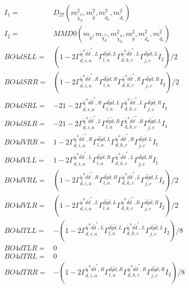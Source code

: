 \documentclass[A4,landscape]{article}
\begin{document}
\begin{align} 
I_1 = & D_{27}(m^2_{\tilde{\chi}^0_{{d}}}, m^2_{\tilde{g}}, m^2_{\tilde{d}_{{a}}}, m^2_{\tilde{d}_{{c}}}) \\ 
I_2 = & MMD0(m_{\tilde{g}}, m_{\tilde{\chi}^0_{{d}}}, m^2_{\tilde{\chi}^0_{{d}}}, m^2_{\tilde{g}}, m^2_{\tilde{d}_{{a}}}, m^2_{\tilde{d}_{{c}}}) \\ 
  BO4dSLL= & (1
-
2 \Gamma^{\tilde{\chi}^0 d \tilde{d}^*,L}_{d, i, a} \Gamma^{\bar{d}\tilde{g} \tilde{d} ,L}_{l, a} \Gamma^{\tilde{\chi}^0 d \tilde{d}^*,L}_{d, k, c} \Gamma^{\bar{d}\tilde{g} \tilde{d} ,L}_{j, c} I_2)/2 \\ 
  BO4dSRR= & (1
-
2 \Gamma^{\tilde{\chi}^0 d \tilde{d}^*,R}_{d, i, a} \Gamma^{\bar{d}\tilde{g} \tilde{d} ,R}_{l, a} \Gamma^{\tilde{\chi}^0 d \tilde{d}^*,R}_{d, k, c} \Gamma^{\bar{d}\tilde{g} \tilde{d} ,R}_{j, c} I_2)/2 \\ 
  BO4dSRL= & -2 1
-
2 \Gamma^{\tilde{\chi}^0 d \tilde{d}^*,R}_{d, i, a} \Gamma^{\bar{d}\tilde{g} \tilde{d} ,L}_{l, a} \Gamma^{\tilde{\chi}^0 d \tilde{d}^*,L}_{d, k, c} \Gamma^{\bar{d}\tilde{g} \tilde{d} ,R}_{j, c} I_1 \\ 
  BO4dSLR= & -2 1
-
2 \Gamma^{\tilde{\chi}^0 d \tilde{d}^*,L}_{d, i, a} \Gamma^{\bar{d}\tilde{g} \tilde{d} ,R}_{l, a} \Gamma^{\tilde{\chi}^0 d \tilde{d}^*,R}_{d, k, c} \Gamma^{\bar{d}\tilde{g} \tilde{d} ,L}_{j, c} I_1 \\ 
  BO4dVRR= & 1
-
2 \Gamma^{\tilde{\chi}^0 d \tilde{d}^*,R}_{d, i, a} \Gamma^{\bar{d}\tilde{g} \tilde{d} ,L}_{l, a} \Gamma^{\tilde{\chi}^0 d \tilde{d}^*,R}_{d, k, c} \Gamma^{\bar{d}\tilde{g} \tilde{d} ,L}_{j, c} I_1 \\ 
  BO4dVLL= & 1
-
2 \Gamma^{\tilde{\chi}^0 d \tilde{d}^*,L}_{d, i, a} \Gamma^{\bar{d}\tilde{g} \tilde{d} ,R}_{l, a} \Gamma^{\tilde{\chi}^0 d \tilde{d}^*,L}_{d, k, c} \Gamma^{\bar{d}\tilde{g} \tilde{d} ,R}_{j, c} I_1 \\ 
  BO4dVRL= & (1
-
2 \Gamma^{\tilde{\chi}^0 d \tilde{d}^*,R}_{d, i, a} \Gamma^{\bar{d}\tilde{g} \tilde{d} ,R}_{l, a} \Gamma^{\tilde{\chi}^0 d \tilde{d}^*,L}_{d, k, c} \Gamma^{\bar{d}\tilde{g} \tilde{d} ,L}_{j, c} I_2)/2 \\ 
  BO4dVLR= & (1
-
2 \Gamma^{\tilde{\chi}^0 d \tilde{d}^*,L}_{d, i, a} \Gamma^{\bar{d}\tilde{g} \tilde{d} ,L}_{l, a} \Gamma^{\tilde{\chi}^0 d \tilde{d}^*,R}_{d, k, c} \Gamma^{\bar{d}\tilde{g} \tilde{d} ,R}_{j, c} I_2)/2 \\ 
  BO4dTLL= & -(1
-
2 \Gamma^{\tilde{\chi}^0 d \tilde{d}^*,L}_{d, i, a} \Gamma^{\bar{d}\tilde{g} \tilde{d} ,L}_{l, a} \Gamma^{\tilde{\chi}^0 d \tilde{d}^*,L}_{d, k, c} \Gamma^{\bar{d}\tilde{g} \tilde{d} ,L}_{j, c} I_2)/8 \\ 
  BO4dTLR= & 0 \\ 
  BO4dTRL= & 0 \\ 
  BO4dTRR= & -(1
-
2 \Gamma^{\tilde{\chi}^0 d \tilde{d}^*,R}_{d, i, a} \Gamma^{\bar{d}\tilde{g} \tilde{d} ,R}_{l, a} \Gamma^{\tilde{\chi}^0 d \tilde{d}^*,R}_{d, k, c} \Gamma^{\bar{d}\tilde{g} \tilde{d} ,R}_{j, c} I_2)/8 \\ 
\end{align} 
\end{document}
